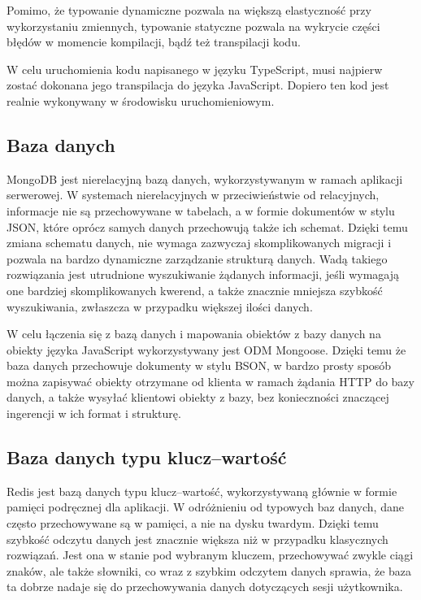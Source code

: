 \documentclass[a4paper,12pt,twoside,openany]{report}
\begin{document}
Pomimo, że typowanie dynamiczne pozwala na większą elastyczność przy wykorzystaniu zmiennych, typowanie statyczne pozwala na wykrycie części błędów w momencie kompilacji, bądź też transpilacji kodu.

W celu uruchomienia kodu napisanego w języku TypeScript, musi najpierw zostać dokonana jego transpilacja do języka JavaScript. Dopiero ten kod jest realnie wykonywany w środowisku uruchomieniowym.

\subsection{Baza danych}
MongoDB jest nierelacyjną bazą danych, wykorzystywanym w ramach aplikacji serwerowej. W systemach nierelacyjnych w przeciwieństwie od relacyjnych, informacje nie są przechowywane w tabelach, a w formie dokumentów w stylu JSON, które oprócz samych danych przechowują także ich schemat. Dzięki temu zmiana schematu danych, nie wymaga zazwyczaj skomplikowanych migracji i pozwala na bardzo dynamiczne zarządzanie strukturą danych. Wadą takiego rozwiązania jest utrudnione wyszukiwanie żądanych informacji, jeśli wymagają one bardziej skomplikowanych kwerend, a także znacznie mniejsza szybkość wyszukiwania, zwłaszcza w przypadku większej ilości danych. 

W celu łączenia się z bazą danych i mapowania obiektów z bazy danych na obiekty języka JavaScript wykorzystywany jest ODM Mongoose. Dzięki temu że baza danych przechowuje dokumenty w stylu BSON, w bardzo prosty sposób można zapisywać obiekty otrzymane od klienta w ramach żądania HTTP do bazy danych, a także wysyłać klientowi obiekty z bazy, bez konieczności znaczącej ingerencji w ich format i strukturę.

\subsection{Baza danych typu klucz--wartość}
Redis jest bazą danych typu klucz--wartość, wykorzystywaną głównie w formie pamięci podręcznej dla aplikacji. W odróżnieniu od typowych baz danych, dane często przechowywane są w pamięci, a nie na dysku twardym. Dzięki temu szybkość odczytu danych jest znacznie większa niż w przypadku klasycznych rozwiązań.
Jest ona w stanie pod wybranym kluczem, przechowywać zwykle ciągi znaków, ale także słowniki, co wraz z szybkim odczytem danych sprawia, że baza ta dobrze nadaje się do przechowywania danych dotyczących sesji użytkownika.
\end{document}
